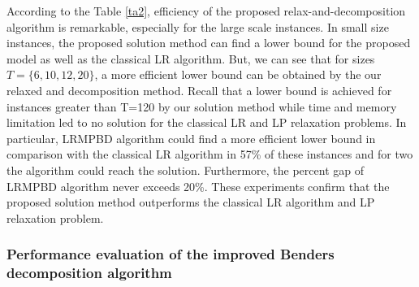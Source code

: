 \documentclass[review]{elsarticle}
\begin{document}
According to the Table \ref{ta2}, efficiency of the proposed relax-and-decomposition algorithm is remarkable, especially for the large scale instances. In small size instances, the proposed solution method can find a lower bound for the proposed model as well as the classical LR algorithm. But, we can see that for sizes $T=\{6, 10, 12, 20\}$, a more efficient lower bound can be obtained by the our relaxed and decomposition method. Recall that a lower bound is achieved for instances greater than T=120 by our solution method while time and memory limitation led to no solution for the classical LR and LP relaxation problems. In particular, LRMPBD algorithm could find a more efficient lower bound in comparison with the classical LR algorithm in 57\% of these instances and for two the algorithm could reach the solution. Furthermore, the percent gap of LRMPBD algorithm never exceeds 20\%. These experiments confirm that the proposed solution method outperforms the classical LR algorithm and LP relaxation problem.

\subsubsection{Performance evaluation of the improved Benders decomposition algorithm}
\end{document}
